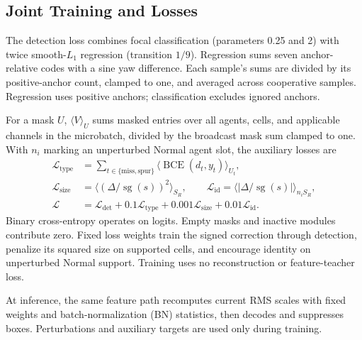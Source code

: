 \documentclass[conference]{IEEEtran}
\DeclareMathOperator{\sg}{sg}
\begin{document}
\subsection{Joint Training and Losses}
The detection loss combines focal classification (parameters 0.25 and 2) with twice smooth-$L_1$ regression (transition $1/9$). Regression sums seven anchor-relative codes with a sine yaw difference. Each sample's sums are divided by its positive-anchor count, clamped to one, and averaged across cooperative samples. Regression uses positive anchors; classification excludes ignored anchors.

For a mask $U$, $\langle V\rangle_U$ sums masked entries over all agents, cells, and applicable channels in the microbatch, divided by the broadcast mask sum clamped to one. With $n_i$ marking an unperturbed Normal agent slot, the auxiliary losses are
\begin{align}
\mathcal L_{\mathrm{type}}&=\sum_{t\in\{\mathrm{miss},\mathrm{spur}\}}\langle\operatorname{BCE}(d_t,y_t)\rangle_{U_t},\nonumber\\
\mathcal L_{\mathrm{size}}&=\langle(\Delta/\sg(s))^2\rangle_{S_R},\qquad
\mathcal L_{\mathrm{id}}=\langle|\Delta/\sg(s)|\rangle_{n_iS_R},\nonumber\\
\mathcal L&=\mathcal L_{\mathrm{det}}+0.1\mathcal L_{\mathrm{type}}
 +0.001\mathcal L_{\mathrm{size}}+0.01\mathcal L_{\mathrm{id}}. \label{eq:loss}
\end{align}
Binary cross-entropy operates on logits. Empty masks and inactive modules contribute zero. Fixed loss weights train the signed correction through detection, penalize its squared size on supported cells, and encourage identity on unperturbed Normal support. Training uses no reconstruction or feature-teacher loss.

At inference, the same feature path recomputes current RMS scales with fixed weights and batch-normalization (BN) statistics, then decodes and suppresses boxes. Perturbations and auxiliary targets are used only during training.



\end{document}
